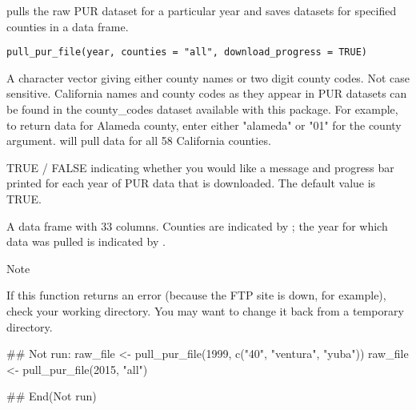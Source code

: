 \documentclass[a4paper]{book}
\begin{document}
%
\begin{Description}\relax
{} pulls the raw PUR dataset for a particular year and
saves datasets for specified counties in a data frame.
\end{Description}
%
\begin{Usage}
\begin{verbatim}
pull_pur_file(year, counties = "all", download_progress = TRUE)
\end{verbatim}
\end{Usage}
%
\begin{Arguments}
\begin{ldescription}
\item[\code{counties}] A character vector giving either county names or two digit
county codes. Not case sensitive. California names and county codes as they
appear in PUR datasets can be found in the county\_codes dataset available
with this package. For example, to return data for Alameda county, enter
either "alameda" or "01" for the county argument. 
will pull data for all 58 California counties.

\item[\code{download\_progress}] TRUE / FALSE indicating whether you would like a
message and progress bar printed for each year of PUR data that is downloaded.
The default value is TRUE.
\end{ldescription}
\end{Arguments}
%
\begin{Value}
A data frame with 33 columns. Counties are indicated by
; the year for which data was pulled is indicated by
.
\end{Value}
%
\begin{Section}{Note}

If this function returns an error (because the FTP site is down, for
example), check your working directory. You may want to change it back from a
temporary directory.

\begin{Examples}
\begin{ExampleCode}
## Not run:
raw\_file <- pull\_pur\_file(1999, c("40", "ventura", "yuba"))
raw\_file <- pull\_pur\_file(2015, "all")

## End(Not run)
\end{ExampleCode}
\end{Examples}
\end{Section}
\end{document}
